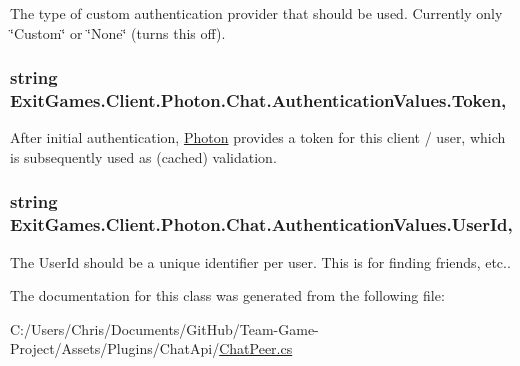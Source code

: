 The type of custom authentication provider that should be used. Currently only \char`\"{}\+Custom\char`\"{} or \char`\"{}\+None\char`\"{} (turns this off).

\subsubsection[{\texorpdfstring{Token}{Token}}]{\setlength{\rightskip}{0pt plus 5cm}string Exit\+Games.\+Client.\+Photon.\+Chat.\+Authentication\+Values.\+Token\hspace{0.3cm}{\ttfamily [get]}, {\ttfamily [set]}}\hypertarget{class_exit_games_1_1_client_1_1_photon_1_1_chat_1_1_authentication_values_a400c002afb41d2ea2a2288e3d010afa6}{}\label{class_exit_games_1_1_client_1_1_photon_1_1_chat_1_1_authentication_values_a400c002afb41d2ea2a2288e3d010afa6}


After initial authentication, \hyperlink{namespace_exit_games_1_1_client_1_1_photon}{Photon} provides a token for this client / user, which is subsequently used as (cached) validation.

\subsubsection[{\texorpdfstring{User\+Id}{UserId}}]{\setlength{\rightskip}{0pt plus 5cm}string Exit\+Games.\+Client.\+Photon.\+Chat.\+Authentication\+Values.\+User\+Id\hspace{0.3cm}{\ttfamily [get]}, {\ttfamily [set]}}\hypertarget{class_exit_games_1_1_client_1_1_photon_1_1_chat_1_1_authentication_values_abe4f64001e4651f97f688a44992caa3b}{}\label{class_exit_games_1_1_client_1_1_photon_1_1_chat_1_1_authentication_values_abe4f64001e4651f97f688a44992caa3b}


The User\+Id should be a unique identifier per user. This is for finding friends, etc..



The documentation for this class was generated from the following file\+:\begin{DoxyCompactItemize}
\item 
C\+:/\+Users/\+Chris/\+Documents/\+Git\+Hub/\+Team-\/\+Game-\/\+Project/\+Assets/\+Plugins/\+Chat\+Api/\hyperlink{_chat_peer_8cs}{Chat\+Peer.\+cs}\end{DoxyCompactItemize}
